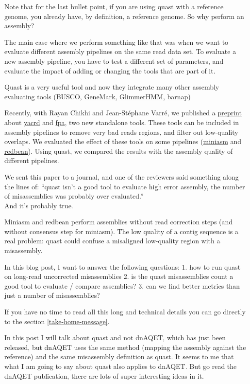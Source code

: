 \documentclass[./main.tex]{subfiles}
\begin{document}
Note that for the last bullet point, if you are using quast with a
reference genome, you already have, by definition, a reference genome.
So why perform an assembly?

The main case where we perform something like that was when we want to
evaluate different assembly pipelines on the same read data set. To
evaluate a new assembly pipeline, you have to test a different set of
parameters, and evaluate the impact of adding or changing the tools that
are part of it.

Quast is a very useful tool and now they integrate many other assembly
evaluating tools (BUSCO, \href{http://exon.gatech.edu/GeneMark/}{GeneMark}, \href{https://doi.org/10.1093/bioinformatics/bth315}{GlimmerHMM}, \href{https://github.com/tseemann/barrnap}{barnap})

Recently, with Rayan Chikhi and Jean-Stéphane Varré, we published a
\href{https://www.biorxiv.org/content/10.1101/674036v2}{preprint} about \href{https://github.com/natir/yacrd/}{yacrd} and
\href{https://github.com/natir/fpa}{fpa}, two new standalone tools.
These tools can be included in assembly pipelines to remove very bad
reads regions, and filter out low-quality overlaps. We evaluated the
effect of these tools on some pipelines
(\href{https://github.com/lh3/miniasm}{miniasm} and
\href{https://github.com/ruanjue/wtdbg2}{redbean}). Using quast, we
compared the results with the assembly quality of different pipelines.

We sent this paper to a journal, and one of the reviewers said something
along the lines of: ``quast isn't a good tool to evaluate high error
assembly, the number of misassemblies was probably over evaluated.''\\
And it's probably true.

Miniasm and redbean perform assemblies without read correction steps
(and without consensus step for miniasm). The low quality of a contig
sequence is a real problem: quast could confuse a misaligned low-quality
region with a misassembly.

In this blog post, I want to answer the following questions: 1. how to
run quast on long-read uncorrected misassemblies 2. is the quast
misassemblies count a good tool to evaluate / compare assemblies? 3. can
we find better metrics than just a number of misassemblies?

If you have no time to read all this long and technical details you can
go directly to the section \ref{take-home-message}.

In this post I will talk about quast and not dnAQET, which has just been
released, but dnAQET uses the same method (mapping the assembly against
the reference) and the same misassembly definition as quast. It seems to
me that what I am going to say about quast also applies to dnAQET. But
go read the dnAQET publication, there are lots of super interesting
ideas in it.
\end{document}
